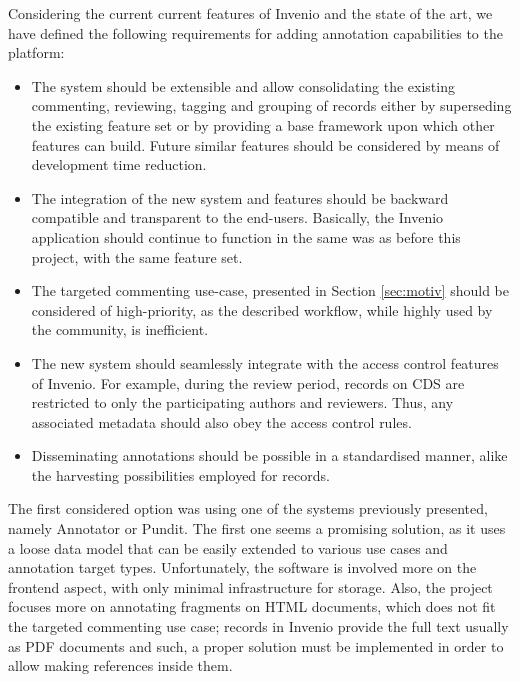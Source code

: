 
Considering the current current features of Invenio and the state of the art, we
have defined the following requirements for adding annotation capabilities to
the platform:
\begin{itemize}
  \item The system should be extensible and allow consolidating the existing
        commenting, reviewing, tagging and grouping of records either by
        superseding the existing feature set or by providing a base framework
        upon which other features can build. Future similar features should be
        considered by means of development time reduction.
  \item The integration of the new system and features should be backward
        compatible and transparent to the end-users. Basically, the Invenio
        application should continue to function in the same was as before this
        project, with the same feature set.
  \item The targeted commenting use-case, presented in Section \ref{sec:motiv}
        should be considered of high-priority, as the described workflow, while
        highly used by the community, is inefficient.
  \item The new system should seamlessly integrate with the access control
        features of Invenio. For example, during the review period, records on
        CDS are restricted to only the participating authors and reviewers.
        Thus, any associated metadata should also obey the access control rules.
  \item Disseminating annotations should be possible in a standardised manner,
        alike the harvesting possibilities employed for records.
\end{itemize}

The first considered option was using one of the systems previously presented,
namely Annotator or Pundit. The first one seems a promising solution, as it
uses a loose data model that can be easily extended to various use cases and
annotation target types. Unfortunately, the software is involved more on the
frontend aspect, with only minimal infrastructure for storage. Also, the
project focuses more on annotating fragments on HTML documents, which does not
fit the targeted commenting use case; records in Invenio provide the full text
usually as PDF documents and such, a proper solution must be implemented in
order to allow making references inside them.

